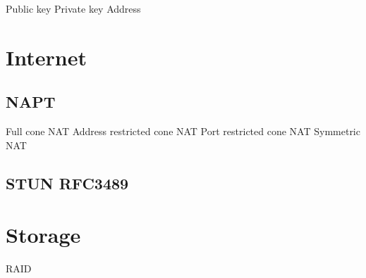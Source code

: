 \documentclass[oneside,reqno]{amsbook}
\begin{document}
Public key
Private key
Address

\part{Internet}

\chapter{NAPT}

Full cone NAT
Address restricted cone NAT
Port restricted cone NAT
Symmetric NAT

\chapter{STUN RFC3489}



\part{Storage}

RAID
\end{document}
